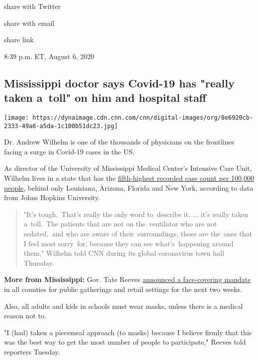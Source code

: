 share with Twitter

share with email

share link

8:39 p.m. ET, August 6, 2020

\hypertarget{mississippi-doctor-says-covid-19-has-really-taken-a-toll-on-him-and-hospital-staff}{%
\subsection{Mississippi doctor says Covid-19 has "really taken a~toll"
on him and hospital
staff}\label{mississippi-doctor-says-covid-19-has-really-taken-a-toll-on-him-and-hospital-staff}}

\texttt{[image: https://dynaimage.cdn.cnn.com/cnn/digital-images/org/8e6920cb-2333-49a6-a5da-1c100b51dc23.jpg]}

Dr. Andrew Wilhelm is one of the thousands of physicians on the
frontlines facing a surge in Covid-19 cases in the US.

As director of the University of Mississippi Medical Center's Intensive
Care Unit, Wilhelm lives in a state that has the
\href{https://www.cnn.com/interactive/2020/health/coronavirus-us-maps-and-cases/}{fifth-highest
recorded case count per 100,000 people}, behind only Louisiana, Arizona,
Florida and New York, according to data from Johns Hopkins University.

\begin{quote}
"It's tough.~That's really the only word to~describe it. ... it's really
taken a~toll.~The patients that are not on the~ventilator who are not
sedated,~and who are aware of their~surroundings, those are the~ones
that I feel most sorry~for, because they can see what's~happening around
them," Wilhelm told CNN during its global coronavirus town hall
Thursday.
\end{quote}

\textbf{More from Mississippi:} Gov. Tate Reeves
\href{https://www.cnn.com/2020/08/05/health/mississippi-coronavirus-masks-schools-positivity-rate/index.html}{announced
a face-covering mandate} in all counties for public gatherings and
retail settings for the next two weeks.

Also, all adults and kids in schools must wear masks, unless there is a
medical reason not to.

"I (had) taken a piecemeal approach (to masks) because I believe firmly
that this was the best way to get the most number of people to
participate," Reeves told reporters Tuesday.


